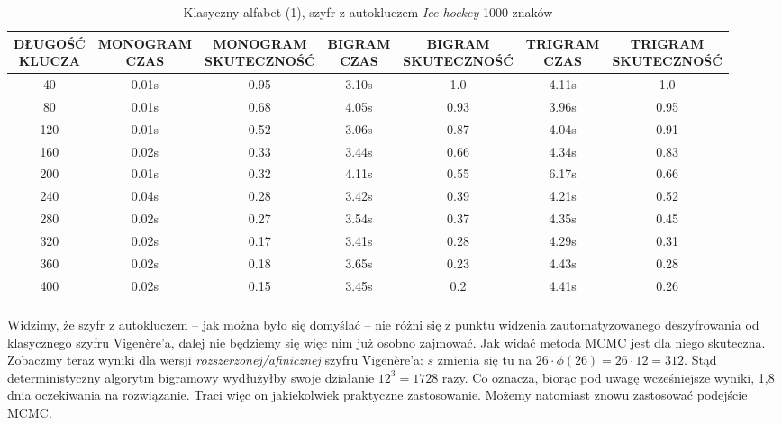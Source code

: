 \documentclass[a4paper]{article}
\theoremstyle{defn}
\theoremstyle{theorem}
\theoremstyle{lemma}
\theoremstyle{cor}
\theoremstyle{fact}
\begin{document}
\begin{center}\begin{small}\begin{longtable}{|c|c|c|c|c|c|c|}
\hline \makecell{DŁUGOŚĆ\\KLUCZA} &  \makecell{MONOGRAM\\CZAS} & \makecell{MONOGRAM\\SKUTECZNOŚĆ} & \makecell{BIGRAM\\CZAS} &  \makecell{BIGRAM\\SKUTECZNOŚĆ} & \makecell{TRIGRAM\\CZAS} & \makecell{TRIGRAM\\SKUTECZNOŚĆ}\\ \hline
40 & 0.01s & 0.95 & 3.10s & 1.0 & 4.11s & 1.0 \\ \hline
80 & 0.01s & 0.68 & 4.05s & 0.93 & 3.96s & 0.95 \\ \hline
120 & 0.01s & 0.52 & 3.06s & 0.87 & 4.04s & 0.91 \\ \hline
160 & 0.02s & 0.33 & 3.44s & 0.66 & 4.34s & 0.83 \\ \hline
200 & 0.01s & 0.32 & 4.11s & 0.55 & 6.17s & 0.66 \\ \hline
240 & 0.04s & 0.28 & 3.42s & 0.39 & 4.21s & 0.52 \\ \hline
280 & 0.02s & 0.27 & 3.54s & 0.37 & 4.35s & 0.45 \\ \hline
320 & 0.02s & 0.17 & 3.41s & 0.28 & 4.29s & 0.31 \\ \hline
360 & 0.02s & 0.18 & 3.65s & 0.23 & 4.43s & 0.28 \\ \hline
400 & 0.02s & 0.15 & 3.45s & 0.2 & 4.41s & 0.26 \\ \hline
\caption{Klasyczny alfabet (1), szyfr z autokluczem \textit{Ice hockey} 1000 znaków}
\end{longtable}\end{small}\end{center}
Widzimy, że szyfr z autokluczem – jak można było się domyślać – nie różni się z punktu widzenia zautomatyzowanego deszyfrowania od klasycznego szyfru Vigenère'a, dalej nie będziemy się więc nim już osobno zajmować. Jak widać metoda MCMC jest dla niego skuteczna.\\
Zobaczmy teraz wyniki dla wersji \textit{rozszerzonej/afinicznej} szyfru Vigenère'a: $s$ zmienia się tu na $26\cdot \phi(26) = 26 \cdot 12 = 312$. Stąd deterministyczny algorytm bigramowy wydłużyłby swoje działanie $12^3 = 1728$ razy. Co oznacza, biorąc pod uwagę wcześniejsze wyniki, 1,8 dnia oczekiwania na rozwiązanie. Traci więc on jakiekolwiek praktyczne zastosowanie. Możemy natomiast znowu zastosować podejście MCMC.
\end{document}
